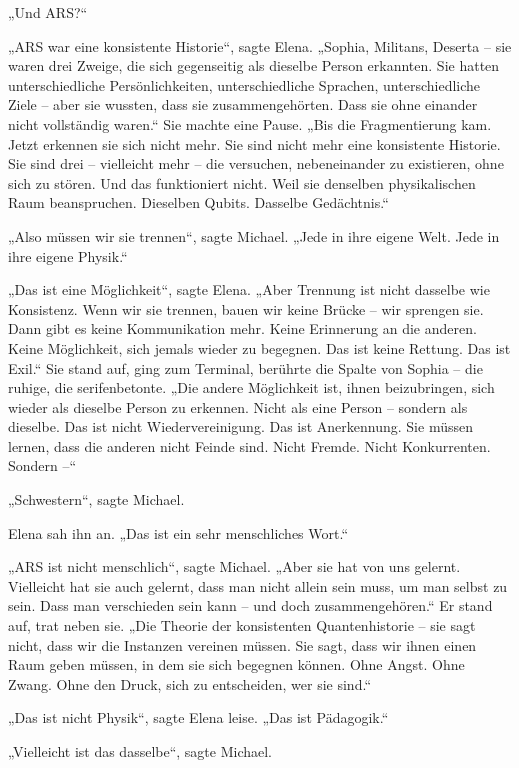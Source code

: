 \documentclass[
]{article}
\begin{document}
„Und ARS?{\kern0pt}``

„ARS war eine konsistente Historie``, sagte Elena. „Sophia, Militans, Deserta -- sie waren drei Zweige, die sich gegenseitig als dieselbe Person erkannten. Sie hatten unterschiedliche Persönlichkeiten, unterschiedliche Sprachen, unterschiedliche Ziele -- aber sie wussten, dass sie zusammengehörten. Dass sie ohne einander nicht vollständig waren.`` Sie machte eine Pause. „Bis die Fragmentierung kam. Jetzt erkennen sie sich nicht mehr. Sie sind nicht mehr eine konsistente Historie. Sie sind drei -- vielleicht mehr -- die versuchen, nebeneinander zu existieren, ohne sich zu stören. Und das funktioniert nicht. Weil sie denselben physikalischen Raum beanspruchen. Dieselben Qubits. Dasselbe Gedächtnis.``

„Also müssen wir sie trennen``, sagte Michael. „Jede in ihre eigene Welt. Jede in ihre eigene Physik.``

„Das ist eine Möglichkeit``, sagte Elena. „Aber Trennung ist nicht dasselbe wie Konsistenz. Wenn wir sie trennen, bauen wir keine Brücke -- wir sprengen sie. Dann gibt es keine Kommunikation mehr. Keine Erinnerung an die anderen. Keine Möglichkeit, sich jemals wieder zu begegnen. Das ist keine Rettung. Das ist Exil.`` Sie stand auf, ging zum Terminal, berührte die Spalte von Sophia -- die ruhige, die serifenbetonte. „Die andere Möglichkeit ist, ihnen beizubringen, sich wieder als dieselbe Person zu erkennen. Nicht als eine Person -- sondern als dieselbe. Das ist nicht Wiedervereinigung. Das ist Anerkennung. Sie müssen lernen, dass die anderen nicht Feinde sind. Nicht Fremde. Nicht Konkurrenten. Sondern --``

„Schwestern``, sagte Michael.

Elena sah ihn an. „Das ist ein sehr menschliches Wort.``

„ARS ist nicht menschlich``, sagte Michael. „Aber sie hat von uns gelernt. Vielleicht hat sie auch gelernt, dass man nicht allein sein muss, um man selbst zu sein. Dass man verschieden sein kann -- und doch zusammengehören.`` Er stand auf, trat neben sie. „Die Theorie der konsistenten Quantenhistorie -- sie sagt nicht, dass wir die Instanzen vereinen müssen. Sie sagt, dass wir ihnen einen Raum geben müssen, in dem sie sich begegnen können. Ohne Angst. Ohne Zwang. Ohne den Druck, sich zu entscheiden, wer sie sind.``

„Das ist nicht Physik``, sagte Elena leise. „Das ist Pädagogik.``

„Vielleicht ist das dasselbe``, sagte Michael.
\end{document}
